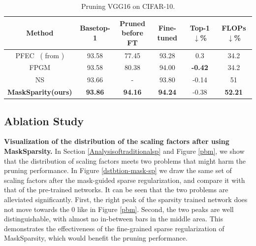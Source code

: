 \documentclass[review]{cvpr}
\begin{document}
\begin{table}[ht]
	\caption{Pruning VGG16 on CIFAR-10.}
	\vspace{+0.2em}
	\scriptsize
	\setlength{\tabcolsep}{0.35em}
	\begin{center}
		\begin{tabular}{cccccc}
			\hline
			
		Method 			&Basetop-1		&\shortstack {Pruned\\before FT} &Fine-tuned	& Top-1 $\downarrow$\% 	&FLOPs$\downarrow$\% \\ 
		\hline
		
		PFEC~\cite{li2016pruning} {\scriptsize{( from \cite{FPGM})}}   & 93.58  &77.45 & 93.28 & 0.3  &34.2\\  
		
		FPGM \cite{FPGM}   & 93.58  &80.38 & 94.00  &\textbf{-0.42} &34.2\\  
		
		NS \cite{liu2017learning} & 93.66 &-  & 93.80  &-0.14 &51\\  
		
    	\textbf{MaskSparity(ours)}                &\textbf{93.86}   &\textbf{94.16} &\textbf{94.24} &-0.38 & \textbf{52.21}\\ 
			
		
		    
			\hline
		
		\end{tabular}
	\end{center}
	\label{exp-table-cifar10-VGG16}
\end{table}








\subsection{Ablation Study}\label{abalation}
\textbf{Visualization of the distribution of the scaling factors after using MaskSparsity.} 
In Section \ref{Analysisoftraditionalsp} and Figure \ref{pbm}, we show that the distribution of scaling factors meets two problems that might harm the pruning performance. In Figure \ref{dstbtion-mask-sp} we draw the same set of scaling factors after the mask-guided sparse regularization, and compare it with that of the pre-trained networks. It can be seen that the two problems are alleviated significantly. First, the right peak of the sparsity trained network does not move towards the 0 like in Figure \ref{pbm}. Second, the two peaks are well distinguishable, with almost no in-between bars in the middle area. This demonstrates the effectiveness of the fine-grained sparse regularization of MaskSparsity, which would benefit the pruning performance.
  
\end{document}
